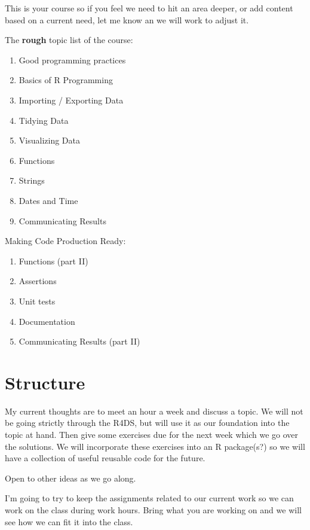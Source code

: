 \documentclass[]{book}
\providecommand{\tightlist}{%
  \setlength{\itemsep}{0pt}\setlength{\parskip}{0pt}}
\theoremstyle{definition}
\theoremstyle{definition}
\theoremstyle{definition}
\theoremstyle{remark}
\begin{document}
This is your course so if you feel we need to hit an area deeper, or add
content based on a current need, let me know an we will work to adjust
it.

The \textbf{rough} topic list of the course:

\begin{enumerate}
\def\labelenumi{\arabic{enumi}.}
\tightlist
\item
  Good programming practices
\item
  Basics of R Programming
\item
  Importing / Exporting Data
\item
  Tidying Data
\item
  Visualizing Data
\item
  Functions
\item
  Strings
\item
  Dates and Time
\item
  Communicating Results
\end{enumerate}

Making Code Production Ready:

\begin{enumerate}
\def\labelenumi{\arabic{enumi}.}
\setcounter{enumi}{9}
\tightlist
\item
  Functions (part II)
\item
  Assertions
\item
  Unit tests
\item
  Documentation
\item
  Communicating Results (part II)
\end{enumerate}

\hypertarget{structure}{%
\section{Structure}\label{structure}}

My current thoughts are to meet an hour a week and discuss a topic. We
will not be going strictly through the R4DS, but will use it as our
foundation into the topic at hand. Then give some exercises due for the
next week which we go over the solutions. We will incorporate these
exercises into an R package(s?) so we will have a collection of useful
reusable code for the future.

Open to other ideas as we go along.

I'm going to try to keep the assignments related to our current work so
we can work on the class during work hours. Bring what you are working
on and we will see how we can fit it into the class.
\end{document}
